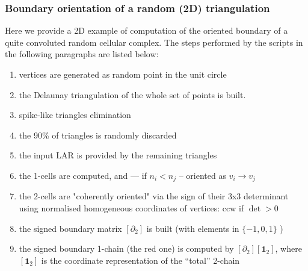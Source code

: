 \documentclass[11pt,oneside]{article}    %
\begin{document}
\subsubsection{Boundary orientation of a random (2D) triangulation}

Here we provide a 2D example of computation of the oriented boundary of a quite convoluted random cellular complex. The steps performed by the scripts in the following paragraphs are listed below:

\begin{enumerate}
\item    vertices are generated as random point in the unit circle
\item    the Delaunay triangulation of the whole set of points is built.
\item    spike-like triangles elimination
\item    the 90\% of triangles is randomly discarded
\item    the input LAR is provided by the remaining triangles
\item    the 1-cells are computed, and —  if  $n_i < n_j$ -- oriented as $v_i \to v_j$
\item    the 2-cells are "coherently oriented" via the sign of their 3x3 determinant 
    using normalised homogeneous coordinates of vertices: ccw if $\det > 0$
\item    the signed boundary matrix $[\partial_2]$ is built (with elements in $\{-1,0,1\}$ )
\item    the signed boundary 1-chain (the red one) is computed by $[\partial_2][\mathbf{1}_2]$,
    where $[\mathbf{1}_2]$ is the coordinate representation of the “total” 2-chain
\end{enumerate}
\end{document}
